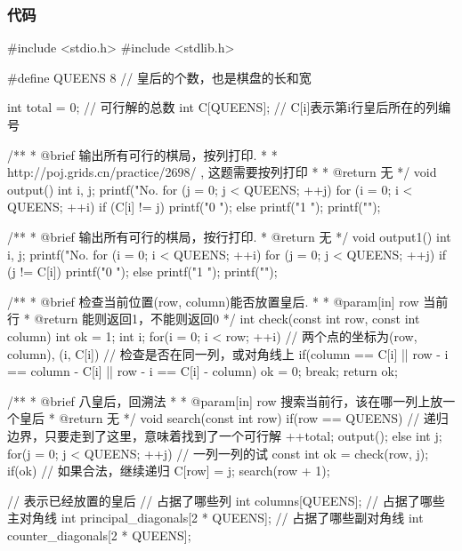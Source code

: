 \subsubsection{代码}
\begin{Codex}[label=eight_queen.c]
#include <stdio.h>
#include <stdlib.h>

#define QUEENS 8 // 皇后的个数，也是棋盘的长和宽

int total = 0;	// 可行解的总数
int C[QUEENS];	// C[i]表示第i行皇后所在的列编号

/** 
 * @brief 输出所有可行的棋局，按列打印.
 *
 * http://poj.grids.cn/practice/2698/ , 这题需要按列打印
 *
 * @return 无
 */
void output() {
    int i, j;
    printf("No. %
    for (j = 0; j < QUEENS; ++j) {
        for (i = 0; i < QUEENS; ++i) {
            if (C[i] != j) {
                printf("0 ");
            } else {
                printf("1 ");
            }
        }
        printf("\n");
    }
}

/** 
 * @brief 输出所有可行的棋局，按行打印.
 * @return 无
 */
void output1() {
    int i, j;
    printf("No. %
    for (i = 0; i < QUEENS; ++i) {
        for (j = 0; j < QUEENS; ++j) {
            if (j != C[i]) {
                printf("0 ");
            } else {
                printf("1 ");
            }
        }
        printf("\n");
    }
}

/** 
 * @brief 检查当前位置(row, column)能否放置皇后.
 *
 * @param[in] row 当前行
 * @return 能则返回1，不能则返回0
 */
int check(const int row, const int column) {
    int ok = 1;
    int i;
    for(i = 0; i < row; ++i) {
        // 两个点的坐标为(row, column), (i, C[i])
        // 检查是否在同一列，或对角线上
        if(column == C[i] || row - i == column - C[i] || 
            row - i == C[i] - column) {
            ok = 0;
            break;
        }
    }
    return ok;
}

/** 
 * @brief 八皇后，回溯法
 *
 * @param[in] row 搜索当前行，该在哪一列上放一个皇后
 * @return 无
 */
void search(const int row) {
    if(row == QUEENS) {  // 递归边界，只要走到了这里，意味着找到了一个可行解
        ++total;
        output();
    } else {
        int j;
        for(j = 0; j < QUEENS; ++j) {  // 一列一列的试
            const int ok = check(row, j);
            if(ok) {  // 如果合法，继续递归
                C[row] = j;
                search(row + 1);
            }
        }
    }
}

// 表示已经放置的皇后
// 占据了哪些列
int columns[QUEENS];
// 占据了哪些主对角线
int principal_diagonals[2 * QUEENS];
// 占据了哪些副对角线
int counter_diagonals[2 * QUEENS];


\end{Codex}
